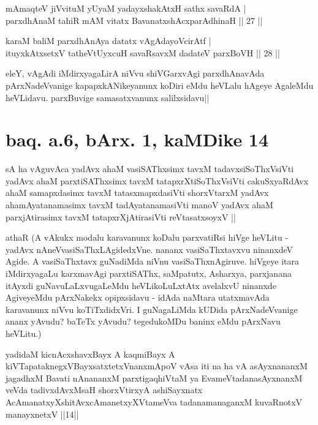 
\begin{shl}
mAmaqteV jiVvituM yUyaM yadayxshakAtxH sathx savaRdA | \\
parxdhAnaM tahiR mAM vitatx BavanatxshAcxparAdhinaH \hfill|| 27 || 
\end{shl}

\begin{shl}
karaM baliM parxdhAnAya datatx vAgAdayoV\s cirAtf | \\
ituyxkAtxsetxV tatheVtUyxcuH savaRsavxM dadateV parxBoVH \hfill|| 28 || 
\end{shl}

\begin{artha}
eleY, vAgAdi iMdirxyagaLirA niVvu shiVGarxvAgi parxdhAnavAda 
pArxNadeVvanige kapapxkANikeyanunx koDiri eMdu heVLalu hAgeye AgaleMdu 
heVLidavu. parxBuvige samasatxvanunx salilxsidavu||
\end{artha}


\section*{baq. a.6, bArx. 1, kaMDike 14}

\begin{shl}
sA ha vAguvAca yadAvx ahaM vasiSAThxsimx tavxM tadavxsiSoThxV\s siVti yadAvx ahaM parxtiSAThxsimx tavxM tatapxrXtiSoThxV\s siVti cakuSxyaRdAvx ahaM samapxdasimx tavxM tatasxmapxdasiVti shorxVtarxM yadAvx ahamAyatanamasimx tavxM tadAyatanamasiVti manoV yadAvx ahaM parxjAtirasimx tavxM tatapxrXjAtirasiVti reVtasatxsoyxV  ||
\end{shl}

athaR (A vAkukx modalu karavanunx koDalu parxvatiRsi hiVge heVLitu - 
yadAvx nAneVvasiSaThxLAgidedxVne. nananx vasiSaThxtavxvu ninanxdeV 
Agide. A vasiSaThxtavx guNadiMda niVnu vasiSaThxnAgiruve. hiVgeye 
itara iMdirxyagaLu karxmavAgi parxtiSAThx, saMpatutx, Asharxya, 
parxjanana itAyxdi guNavuLaLxvugaLeMdu heVLikoLuLxtAtx avelalxvU 
ninanxde AgiveyeMdu pArxNakekx opipxsidavu - idAda naMtara utatxmavAda 
karavanunx niVvu koTiTxdidxVri. I guNagaLiMda kUDida pArxNadeVvanige 
ananx yAvudu? baTeTx yAvudu? tegedukoMDu baninx eMdu pArxNavu heVLitu.)

\begin{shl}
 yadidaM kicnAcxshavxBayx A kaqmiBayx A kiVTapataknegxVBayxsatxtetxV\s nanxmApoV vAsa iti na ha vA asAyxnananxM jagadhxM Bavati nAnananxM parxtigaqhiVtaM ya EvameVtadanasAyxnanxM veVda tadivxdAvxMsaH shorxVtirxyA ashiSayxnatx AcAmanatxyXshitAvxcAmanetxyXVtameVva tadanamanaganxM kuvaRnotxV manayxnetxV ||14||
\end{shl}

